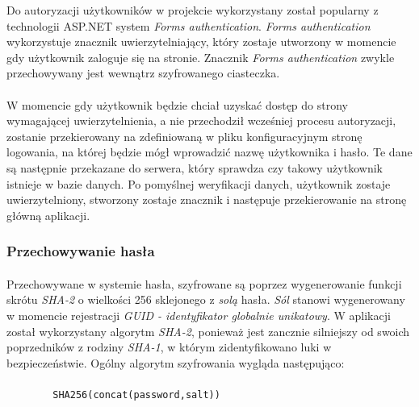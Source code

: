 Do autoryzacji użytkowników w projekcie wykorzystany został popularny z technologii ASP.NET system \textit{Forms authentication}. \textit{Forms authentication} wykorzystuje znacznik uwierzytelniający, który zostaje utworzony w momencie gdy użytkownik zaloguje się na stronie. Znacznik \textit{Forms authentication} zwykle przechowywany jest wewnątrz szyfrowanego ciasteczka.

\paragraph{} %
\label{par:}
W momencie gdy użytkownik będzie chciał uzyskać dostęp do strony wymagającej uwierzytelnienia, a nie przechodził wcześniej procesu autoryzacji, zostanie przekierowany na zdefiniowaną w pliku konfiguracyjnym stronę logowania, na której będzie mógł wprowadzić nazwę użytkownika i hasło. Te dane są następnie przekazane do serwera, który sprawdza czy takowy użytkownik istnieje w bazie danych. Po pomyślnej weryfikacji danych, użytkownik zostaje uwierzytelniony, stworzony zostaje znacznik i następuje przekierowanie na stronę główną aplikacji.

\subsubsection{Przechowywanie hasła}
\paragraph{} %
\label{par:}
Przechowywane w systemie hasła, szyfrowane są poprzez wygenerowanie funkcji skrótu \textit{SHA-2} o wielkości 256 sklejonego z \textit{solą} hasła. \textit{Sól} stanowi wygenerowany w momencie rejestracji \textit{GUID - identyfikator globalnie unikatowy}. W aplikacji został wykorzystany algorytm \textit{SHA-2}, ponieważ jest zancznie silniejszy od swoich poprzedników z rodziny \textit{SHA-1}, w którym zidentyfikowano luki w bezpieczeństwie. Ogólny algorytm szyfrowania wygląda następująco:

\paragraph{} %
\label{par:}


\begin{lstlisting}
		SHA256(concat(password,salt))
\end{lstlisting}

